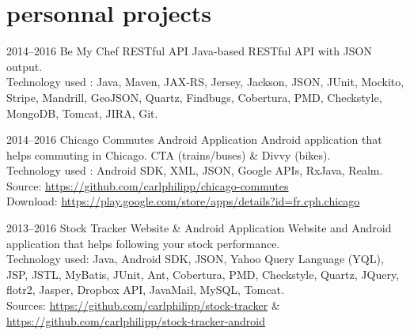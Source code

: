 \documentclass[]{friggeri-cv} %
\begin{document}

\section{personnal projects}

\begin{entrylist}

\entry
{2014--2016}
{Be My Chef}
{  RESTful API}
{}
{Java-based RESTful API with JSON output.\\
Technology used : Java, Maven, JAX-RS, Jersey, Jackson, JSON, JUnit, Mockito, Stripe, Mandrill, GeoJSON, Quartz, Findbugs, Cobertura, PMD, Checkstyle, MongoDB, Tomcat, JIRA, Git.}

\end{entrylist}

\begin{entrylist}

\entry
{2014--2016}
{Chicago Commutes}
{  Android Application}
{}
{Android application that helps commuting in Chicago. CTA (trains/buses) \& Divvy (bikes).\\
Technology used : Android SDK, XML, JSON, Google APIs, RxJava, Realm.\\
\footnotesize{Source: \href{https://github.com/carlphilipp/chicago-commutes}{https://github.com/carlphilipp/chicago-commutes}}\\
\footnotesize{Download: \href{https://play.google.com/store/apps/details?id=fr.cph.chicago}{https://play.google.com/store/apps/details?id=fr.cph.chicago}}}

\end{entrylist}

\begin{entrylist}

\entry
{2013--2016}
{Stock Tracker}
{  Website \& Android Application}
{}
{Website and Android application that helps following your stock performance.\\
Technology used: Java, Android SDK, JSON, Yahoo Query Language (YQL), JSP, JSTL, MyBatis,
JUnit, Ant, Cobertura, PMD, Checkstyle, Quartz, JQuery, flotr2, Jasper, Dropbox API, JavaMail,
MySQL, Tomcat.\\
\footnotesize{Sources: \href{https://github.com/carlphilipp/stock-tracker}{https://github.com/carlphilipp/stock-tracker} \& \href{https://github.com/carlphilipp/stock-tracker}{https://github.com/carlphilipp/stock-tracker-android}}}

\end{entrylist}
\end{document}

